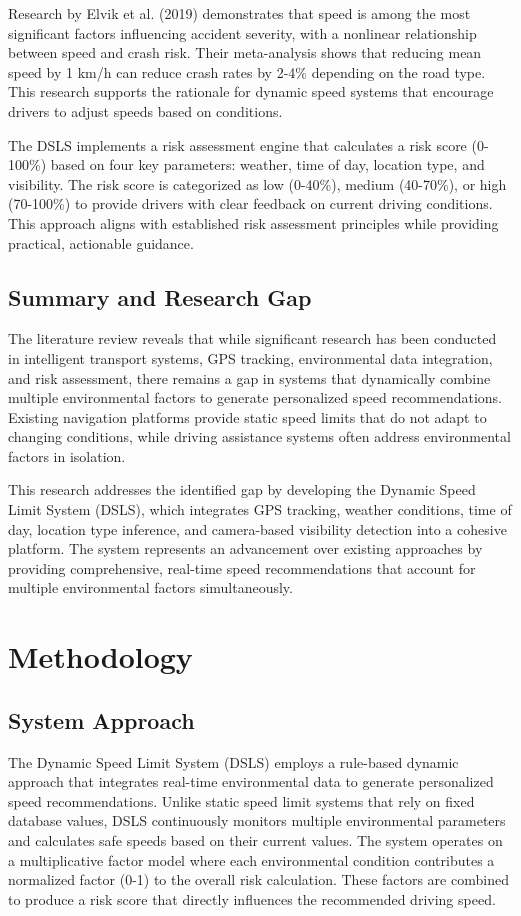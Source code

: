 Research by Elvik et al. (2019) demonstrates that speed is among the most significant factors influencing accident severity, with a nonlinear relationship between speed and crash risk. Their meta-analysis shows that reducing mean speed by 1 km/h can reduce crash rates by 2-4\% depending on the road type. This research supports the rationale for dynamic speed systems that encourage drivers to adjust speeds based on conditions.

The DSLS implements a risk assessment engine that calculates a risk score (0-100\%) based on four key parameters: weather, time of day, location type, and visibility. The risk score is categorized as low (0-40\%), medium (40-70\%), or high (70-100\%) to provide drivers with clear feedback on current driving conditions. This approach aligns with established risk assessment principles while providing practical, actionable guidance.

\section{Summary and Research Gap}
The literature review reveals that while significant research has been conducted in intelligent transport systems, GPS tracking, environmental data integration, and risk assessment, there remains a gap in systems that dynamically combine multiple environmental factors to generate personalized speed recommendations. Existing navigation platforms provide static speed limits that do not adapt to changing conditions, while driving assistance systems often address environmental factors in isolation.

This research addresses the identified gap by developing the Dynamic Speed Limit System (DSLS), which integrates GPS tracking, weather conditions, time of day, location type inference, and camera-based visibility detection into a cohesive platform. The system represents an advancement over existing approaches by providing comprehensive, real-time speed recommendations that account for multiple environmental factors simultaneously.

\chapter{Methodology}\label{chapter:Methodology}
\section{System Approach}
The Dynamic Speed Limit System (DSLS) employs a rule-based dynamic approach that integrates real-time environmental data to generate personalized speed recommendations. Unlike static speed limit systems that rely on fixed database values, DSLS continuously monitors multiple environmental parameters and calculates safe speeds based on their current values. The system operates on a multiplicative factor model where each environmental condition contributes a normalized factor (0-1) to the overall risk calculation. These factors are combined to produce a risk score that directly influences the recommended driving speed.

